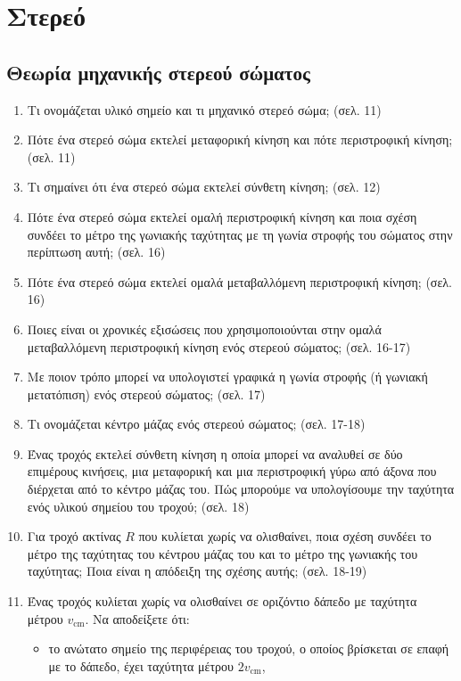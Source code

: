 \documentclass{article}
\begin{document}
\section{Στερεό}

\subsection{Θεωρία μηχανικής στερεού σώματος}

\begin{enumerate}
      \item Τι ονομάζεται υλικό σημείο και τι μηχανικό στερεό σώμα; (σελ. 11)
      \item Πότε ένα στερεό σώμα εκτελεί μεταφορική κίνηση και πότε περιστροφική κίνηση; (σελ. 11)
      \item Τι σημαίνει ότι ένα στερεό σώμα εκτελεί σύνθετη κίνηση; (σελ. 12)
      \item Πότε ένα στερεό σώμα εκτελεί ομαλή περιστροφική κίνηση και ποια σχέση συνδέει το μέτρο της γωνιακής ταχύτητας με τη γωνία στροφής του σώματος στην περίπτωση αυτή; (σελ. 16)
      \item Πότε ένα στερεό σώμα εκτελεί ομαλά μεταβαλλόμενη περιστροφική κίνηση; (σελ. 16)
      \item Ποιες είναι οι χρονικές εξισώσεις που χρησιμοποιούνται στην ομαλά μεταβαλλόμενη περιστροφική κίνηση ενός στερεού σώματος; (σελ. 16-17)
      \item Με ποιον τρόπο μπορεί να υπολογιστεί γραφικά η γωνία στροφής (ή γωνιακή μετατόπιση) ενός στερεού σώματος; (σελ. 17)
      \item Τι ονομάζεται κέντρο μάζας ενός στερεού σώματος; (σελ. 17-18)
      \item Ένας τροχός εκτελεί σύνθετη κίνηση η οποία μπορεί να αναλυθεί σε δύο επιμέρους κινήσεις, μια μεταφορική και μια περιστροφική γύρω από άξονα που διέρχεται από το κέντρο μάζας του. Πώς μπορούμε να υπολογίσουμε την ταχύτητα ενός υλικού σημείου του τροχού; (σελ. 18)
      \item Για τροχό ακτίνας $R$ που κυλίεται χωρίς να ολισθαίνει, ποια σχέση συνδέει το μέτρο της ταχύτητας του κέντρου μάζας του και το μέτρο της γωνιακής του ταχύτητας; Ποια είναι η απόδειξη της σχέσης αυτής; (σελ. 18-19)
      \item Ένας τροχός κυλίεται χωρίς να ολισθαίνει σε οριζόντιο δάπεδο με ταχύτητα μέτρου $v_{\text{cm}}$. Να αποδείξετε ότι:
            \begin{itemize}
                  \item[α)] το ανώτατο σημείο της περιφέρειας του τροχού, ο οποίος βρίσκεται σε επαφή με το δάπεδο, έχει ταχύτητα μέτρου $2v_{\text{cm}}$,

\end{itemize}
\end{enumerate}
\end{document}
